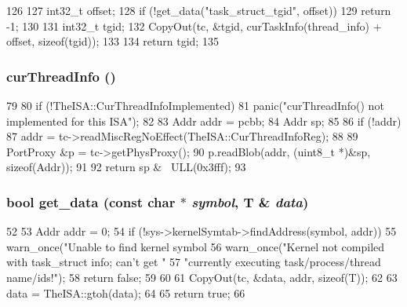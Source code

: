 \begin{DoxyCode}
126     {
127         int32_t offset;
128         if (!get_data("task_struct_tgid", offset))
129             return -1;
130 
131         int32_t tgid;
132         CopyOut(tc, &tgid, curTaskInfo(thread_info) + offset, sizeof(tgid));
133 
134         return tgid;
135     }
\end{DoxyCode}
\hypertarget{classLinux_1_1ThreadInfo_a858f183600a76216a02ed8118d784cdc}{
\subsubsection[{curThreadInfo}]{ curThreadInfo ()}}
\label{classLinux_1_1ThreadInfo_a858f183600a76216a02ed8118d784cdc}



\begin{DoxyCode}
79     {
80         if (!TheISA::CurThreadInfoImplemented)
81             panic("curThreadInfo() not implemented for this ISA");
82 
83         Addr addr = pcbb;
84         Addr sp;
85 
86         if (!addr)
87             addr = tc->readMiscRegNoEffect(TheISA::CurThreadInfoReg);
88 
89         PortProxy &p = tc->getPhysProxy();
90         p.readBlob(addr, (uint8_t *)&sp, sizeof(Addr));
91 
92         return sp & ~ULL(0x3fff);
93     }
\end{DoxyCode}
\hypertarget{classLinux_1_1ThreadInfo_af0da1d324f55329a4d5ca716b05dc79f}{
\subsubsection[{get\_\-data}]{\setlength{\rightskip}{0pt plus 5cm}bool get\_\-data (const char $\ast$ {\em symbol}, \/  T \& {\em data})}}
\label{classLinux_1_1ThreadInfo_af0da1d324f55329a4d5ca716b05dc79f}



\begin{DoxyCode}
52     {
53         Addr addr = 0;
54         if (!sys->kernelSymtab->findAddress(symbol, addr)) {
55             warn_once("Unable to find kernel symbol %
56             warn_once("Kernel not compiled with task_struct info; can't get "
57                       "currently executing task/process/thread name/ids!\n");
58             return false;
59         }
60 
61         CopyOut(tc, &data, addr, sizeof(T));
62 
63         data = TheISA::gtoh(data);
64 
65         return true;
66     }
\end{DoxyCode}


